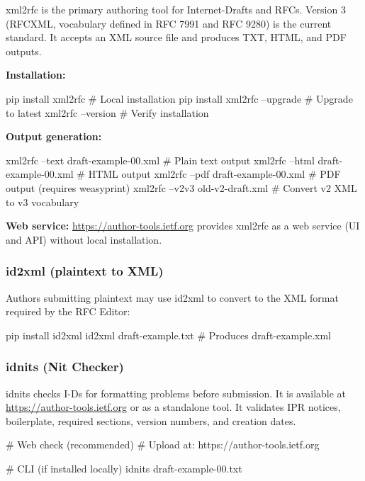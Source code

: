 \documentclass[11pt,letterpaper]{article}
\begin{document}
xml2rfc is the primary authoring tool for Internet-Drafts and RFCs. Version 3 (RFCXML, vocabulary defined in RFC 7991 and RFC 9280) is the current standard. It accepts an XML source file and produces TXT, HTML, and PDF outputs.

\textbf{Installation:}

\begin{codebox}
pip install xml2rfc        # Local installation
pip install xml2rfc --upgrade   # Upgrade to latest
xml2rfc --version          # Verify installation
\end{codebox}

\textbf{Output generation:}

\begin{codebox}
xml2rfc --text    draft-example-00.xml    # Plain text output
xml2rfc --html    draft-example-00.xml    # HTML output
xml2rfc --pdf     draft-example-00.xml    # PDF output (requires weasyprint)
xml2rfc --v2v3    old-v2-draft.xml        # Convert v2 XML to v3 vocabulary
\end{codebox}

\textbf{Web service:} \url{https://author-tools.ietf.org} provides xml2rfc as a web service (UI and API) without local installation.

\subsubsection{id2xml (plaintext to XML)}

Authors submitting plaintext may use id2xml to convert to the XML format required by the RFC Editor:

\begin{codebox}
pip install id2xml
id2xml draft-example.txt   # Produces draft-example.xml
\end{codebox}

\subsubsection{idnits (Nit Checker)}

idnits checks I-Ds for formatting problems before submission. It is available at \url{https://author-tools.ietf.org} or as a standalone tool. It validates IPR notices, boilerplate, required sections, version numbers, and creation dates.

\begin{codebox}
# Web check (recommended)
# Upload at: https://author-tools.ietf.org

# CLI (if installed locally)
idnits draft-example-00.txt
\end{codebox}
\end{document}
